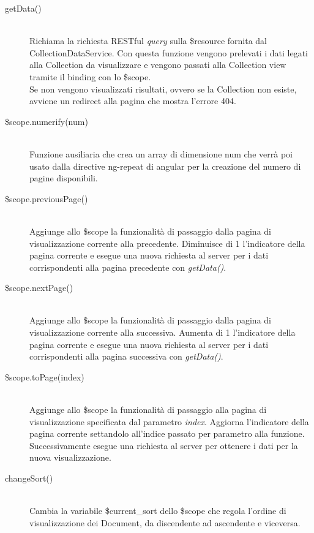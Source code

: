 \begin{description}
\begin{description}
  \item[getData()] \hfill \\
  Richiama la richiesta RESTful \textit{query} sulla \$resource fornita dal CollectionDataService.
  Con questa funzione vengono prelevati i dati legati alla Collection da visualizzare e vengono
  passati alla Collection view tramite il binding con lo \$scope. \\
  Se non vengono visualizzati risultati, ovvero se la Collection non esiste, avviene un redirect alla pagina
  che mostra l'errore 404.
  
  \item[\$scope.numerify(num)] \hfill \\
  Funzione ausiliaria che crea un array di dimensione   {num} che verrà poi usato dalla directive   {ng-repeat} di angular per la creazione 
  del numero di 
  pagine disponibili.
  
  \item[\$scope.previousPage()] \hfill \\
  Aggiunge allo \$scope la funzionalità di passaggio dalla pagina di visualizzazione corrente alla precedente.
  Diminuisce di 1 l'indicatore della pagina corrente e esegue una nuova richiesta al server per i dati corrispondenti
  alla pagina precedente con \emph{getData()}.
  
  \item[\$scope.nextPage()] \hfill \\
  Aggiunge allo \$scope la funzionalità di passaggio dalla pagina di visualizzazione corrente alla successiva.
  Aumenta di 1 l'indicatore della pagina corrente e esegue una nuova richiesta al server per i dati corrispondenti
  alla pagina successiva con \emph{getData()}.
  
  \item[\$scope.toPage(index)] \hfill \\
  Aggiunge allo \$scope la funzionalità di passaggio alla pagina di visualizzazione specificata dal parametro \emph{index}.
  Aggiorna l'indicatore della pagina corrente settandolo all'indice passato per parametro alla funzione.
  Successivamente esegue una richiesta al server per ottenere i dati per la nuova visualizzazione.
  
  \item[changeSort()] \hfill \\
  Cambia la variabile \$current\_sort dello \$scope che regola l'ordine di visualizzazione dei Document, da discendente ad
  ascendente e viceversa.
  

\end{description}
\end{description}
